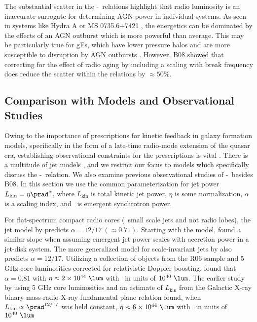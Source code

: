 \documentclass{emulateapj}
\begin{document}
The substantial scatter in the \pjet-\prad\ relations highlight that
radio luminosity is an inaccurate surrogate for determining AGN power
in individual systems. As seen in systems like Hydra A \citep{hydraa}
or MS 0735.6+7421 \citep{ms0735}, the energetics can be dominated by
the effects of an AGN outburst which is more powerful than
average. This may be particularly true for gEs, which have lower
pressure halos and are more susceptible to disruption by AGN outbursts
\citep{2006MNRAS.372.1161W, 2008ApJ...687L..53P}. However, B08 showed
that correcting for the effect of radio aging by including a scaling
with break frequency does reduce the scatter within the relations by
$\approx 50\%$.

\subsection{Comparison with Models and Observational Studies}
\label{sec:models}

Owing to the importance of prescriptions for kinetic feedback in
galaxy formation models, specifically in the form of a late-time
radio-mode extension of the quasar era, establishing observational
constraints for the prescriptions is vital
\citep[\eg][]{2007ApJ...658L...9H}. There is a multitude of jet models
\citep[\ie][]{1973MNRAS.164..243L, 1974MNRAS.166..513S,
  1974MNRAS.169..395B, 1989ApJ...345L..21B, 2002ApJS..141..337C,
  2002ApJS..141..371C}, and we restrict our focus to models which
specifically discuss the \pjet-\prad\ relation. We also examine
previous observational studies of \pjet-\prad\ besides B08. In this
section we use the common parameterization for jet power
$L_{\mathrm{kin}} = \eta \prad^{\alpha}$, where $L_{\mathrm{kin}}$ is
total kinetic jet power, $\eta$ is some normalization, $\alpha$ is a
scaling index, and \prad\ is emergent synchrotron power.

For flat-spectrum compact radio cores (\eg\ small scale jets and not
radio lobes), the jet model by \citet{1979ApJ...232...34B} predicts
$\alpha = 12/17~(\approx 0.71)$. Starting with the
\citet{1979ApJ...232...34B} model, \citet{1995A&A...293..665F} found a
similar slope when assuming emergent jet power scales with accretion
power in a jet-disk system. The more generalized model for
scale-invariant jets by \citet{2003MNRAS.343L..59H} also predicts
$\alpha = 12/17$. Utilizing a collection of objects from the R06
sample and 5 GHz core luminosities corrected for relativistic Doppler
boosting, \citet{2007MNRAS.381..589M} found that $\alpha = 0.81$ with
$\eta \approx 2\times10^{44} ~\lum$ with \prad\ in units of $10^{40}
~\lum$. The earlier study by \citet{2005ApJ...633..384H} using 5 GHz
core luminosities and an estimate of $L_{\mathrm{kin}}$ from the
Galactic X-ray binary mass-radio-X-ray fundamental plane relation
\citep{2003MNRAS.344...60G, 2003MNRAS.345.1057M} found, when
$L_{\mathrm{kin}} \propto \prad^{12/17}$ was held constant, $\eta
\approx 6\times10^{44} ~\lum$ with \prad\ in units of $10^{40} ~\lum$
\end{document}
